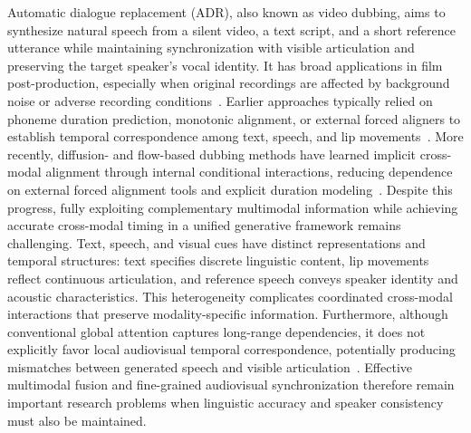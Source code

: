 Automatic dialogue replacement (ADR), also known as video dubbing, aims to synthesize natural speech from a silent video, a text script, and a short reference utterance while maintaining synchronization with visible articulation and preserving the target speaker's vocal identity. It has broad applications in film post-production, especially when original recordings are affected by background noise or adverse recording conditions~\cite{hu2021neuraldub,cong2023hpmdubbing}. Earlier approaches typically relied on phoneme duration prediction, monotonic alignment, or external forced aligners to establish temporal correspondence among text, speech, and lip movements~\cite{cong2024styledubber,zhang2024speaker2dubber,zhang2025produbber}. More recently, diffusion- and flow-based dubbing methods have learned implicit cross-modal alignment through internal conditional interactions, reducing dependence on external forced alignment tools and explicit duration modeling~\cite{choi2025aligndit,cong2026cosyncdit,cong2026ultradub}. Despite this progress, fully exploiting complementary multimodal information while achieving accurate cross-modal timing in a unified generative framework remains challenging. Text, speech, and visual cues have distinct representations and temporal structures: text specifies discrete linguistic content, lip movements reflect continuous articulation, and reference speech conveys speaker identity and acoustic characteristics. This heterogeneity complicates coordinated cross-modal interactions that preserve modality-specific information. Furthermore, although conventional global attention captures long-range dependencies, it does not explicitly favor local audiovisual temporal correspondence, potentially producing mismatches between generated speech and visible articulation~\cite{cheng2025mmaudio,tran2026precise}. Effective multimodal fusion and fine-grained audiovisual synchronization therefore remain important research problems when linguistic accuracy and speaker consistency must also be maintained.

